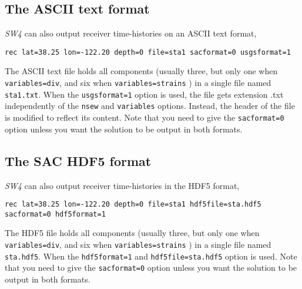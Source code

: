 \documentclass[11pt]{report}
\begin{document}
\subsection{The ASCII text format}
\emph{SW4} can also output receiver time-histories on an ASCII text format,
\begin{verbatim}
rec lat=38.25 lon=-122.20 depth=0 file=sta1 sacformat=0 usgsformat=1
\end{verbatim}
The ASCII text file holds all components (usually three, but only one when {\tt
  variables=div}, and six when {\tt variables=strains} ) in a single file named {\tt sta1.txt}. When
the \verb+usgsformat=1+ option is used, the file gets extension .txt independently of the
\verb+nsew+ and \verb+variables+ options.  Instead, the header of the file is modified to reflect
its content. Note that you need to give the \verb+sacformat=0+ option unless you want the solution
to be output in both formats.

\subsection{The SAC HDF5 format}
\emph{SW4} can also output receiver time-histories in the HDF5 format,
\begin{verbatim}
rec lat=38.25 lon=-122.20 depth=0 file=sta1 hdf5file=sta.hdf5 sacformat=0 hdf5format=1
\end{verbatim}
The HDF5 file holds all components (usually three, but only one when {\tt
  variables=div}, and six when {\tt variables=strains} ) in a single file named {\tt sta.hdf5}. When
the \verb+hdf5format=1+ and \verb+hdf5file=sta.hdf5+ option is used. 
Note that you need to give the \verb+sacformat=0+ option unless you want the solution
to be output in both formats.
\end{document}

